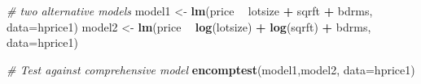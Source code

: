 \documentclass[]{book}
\newenvironment{Shaded}{\begin{snugshade}}{\end{snugshade}}
\newcommand{\CommentTok}[1]{\textcolor[rgb]{0.56,0.35,0.01}{\textit{#1}}}
\newcommand{\DataTypeTok}[1]{\textcolor[rgb]{0.13,0.29,0.53}{#1}}
\newcommand{\KeywordTok}[1]{\textcolor[rgb]{0.13,0.29,0.53}{\textbf{#1}}}
\newcommand{\NormalTok}[1]{#1}
\newcommand{\OperatorTok}[1]{\textcolor[rgb]{0.81,0.36,0.00}{\textbf{#1}}}
\newcommand{\StringTok}[1]{\textcolor[rgb]{0.31,0.60,0.02}{#1}}
\begin{document}
\begin{Shaded}
\begin{Highlighting}[]
\CommentTok{# two alternative models}
\NormalTok{model1 <-}\StringTok{ }\KeywordTok{lm}\NormalTok{(price }\OperatorTok{~}\StringTok{     }\NormalTok{lotsize  }\OperatorTok{+}\StringTok{     }\NormalTok{sqrft  }\OperatorTok{+}\StringTok{ }\NormalTok{bdrms, }\DataTypeTok{data=}\NormalTok{hprice1)}
\NormalTok{model2 <-}\StringTok{ }\KeywordTok{lm}\NormalTok{(price }\OperatorTok{~}\StringTok{ }\KeywordTok{log}\NormalTok{(lotsize) }\OperatorTok{+}\StringTok{ }\KeywordTok{log}\NormalTok{(sqrft) }\OperatorTok{+}\StringTok{ }\NormalTok{bdrms, }\DataTypeTok{data=}\NormalTok{hprice1)}

\CommentTok{# Test against comprehensive model}
\KeywordTok{encomptest}\NormalTok{(model1,model2, }\DataTypeTok{data=}\NormalTok{hprice1)}
\end{Highlighting}
\end{Shaded}
\end{document}
